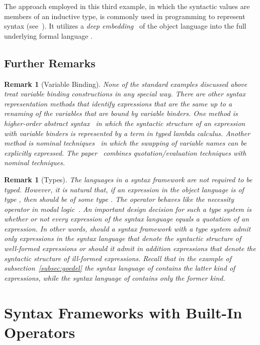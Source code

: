 \documentclass[11pt,fleqn]{article}
\newtheorem{rem}[thm]{Remark}
\begin{document}
The approach employed in this third example, in which the syntactic
values are members of an inductive type, is commonly used in
programming to represent syntax (see~\cite{FriedmanWand08}).  It
utilizes a \emph{deep embedding}~\cite{BoultonEtAl93} of the object
language  into the full underlying formal language .

\subsection{Further Remarks}

\begin{rem}[Variable Binding]\em
None of the standard examples discussed above treat variable binding
constructions in any special way.  There are other syntax
representation methods that identify expressions that are the same up
to a renaming of the variables that are bound by variable binders.
One method is \emph{higher-order abstract
  syntax}~\cite{Miller00,PfenningElliot88} in which the syntactic
structure of an expression with variable binders is represented by a
term in typed lambda calculus.  Another method is \emph{nominal
  techniques}~\cite{GabbayPitts02,Pitts03} in which the swapping of
variable names can be explicitly expressed.  The
paper~\cite{NanevskiPfenning05} combines quotation/evaluation
techniques with nominal techniques.\hfill 
\end{rem}

\begin{rem}[Types]\em
The languages in a syntax framework are not required to be typed.
However, it is natural that, if an expression  in the object
language is of type , then  should be of some type
.  The operator  behaves like the
necessity operator  in modal logic~\cite{DaviesPfenning01}.  An
important design decision for such a type system is whether or not
every expression of the syntax language equals a quotation of an
expression.  In other words, should a syntax framework with a type
system admit only expressions in the syntax language that denote the
syntactic structure of well-formed expressions or should it admit in
addition expressions that denote the syntactic structure of ill-formed
expressions.  Recall that in the example of
subsection~\ref{subsec:goedel} the syntax language of  contains the
latter kind of expressions, while the syntax language of  contains
only the former kind.\hfill
\end{rem}

\section{Syntax Frameworks with Built-In Operators} \label{sec:built-in}
\end{document}
